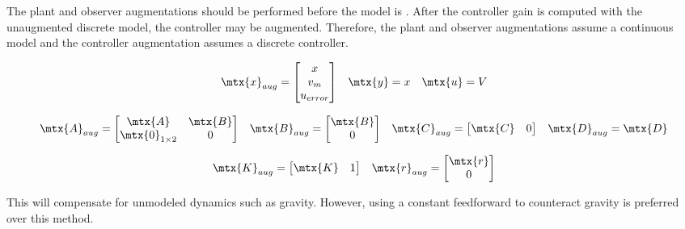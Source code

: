 The \gls{plant} and \gls{observer} augmentations should be performed before the
\gls{model} is . After the \gls{controller}
gain is computed with the unaugmented discrete \gls{model}, the controller may
be augmented. Therefore, the \gls{plant} and \gls{observer} augmentations assume
a continuous \gls{model} and the \gls{controller} augmentation assumes a
discrete \gls{controller}.

\begin{equation*}
  \begin{array}{ccc}
    \mtx{x}_{aug} =
    \begin{bmatrix}
      x \\
      v_m \\
      u_{error}
    \end{bmatrix} &
    \mtx{y} = x &
    \mtx{u} = V
  \end{array}
\end{equation*}

\begin{equation}
  \begin{array}{cccc}
    \mtx{A}_{aug} =
    \begin{bmatrix}
      \mtx{A} & \mtx{B} \\
      \mtx{0}_{1 \times 2} & 0
    \end{bmatrix} &
    \mtx{B}_{aug} =
    \begin{bmatrix}
      \mtx{B} \\
      0
    \end{bmatrix} &
    \mtx{C}_{aug} = \begin{bmatrix}
      \mtx{C} & 0
    \end{bmatrix} &
    \mtx{D}_{aug} = \mtx{D}
  \end{array}
\end{equation}

\begin{equation}
  \begin{array}{cc}
    \mtx{K}_{aug} = \begin{bmatrix}
      \mtx{K} & 1
    \end{bmatrix} &
    \mtx{r}_{aug} = \begin{bmatrix}
      \mtx{r} \\
      0
    \end{bmatrix}
  \end{array}
\end{equation}

This will compensate for unmodeled dynamics such as gravity. However, using a
constant feedforward to counteract gravity is preferred over this method.


